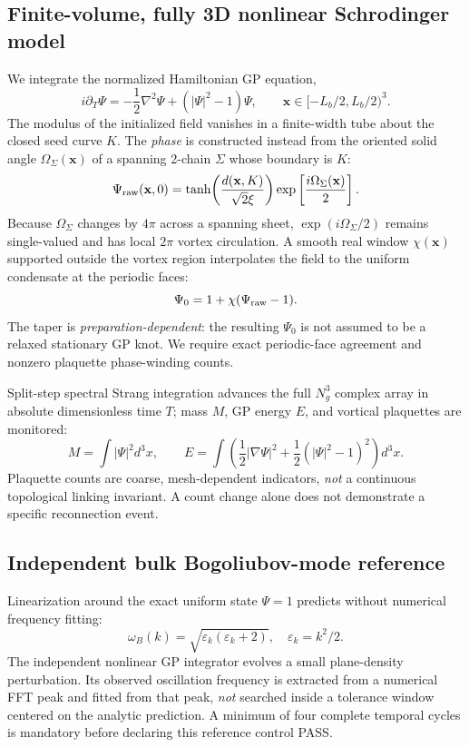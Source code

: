 \documentclass[10pt,a4paper]{article}
\begin{document}
\subsection{Finite-volume, fully 3D nonlinear Schrodinger model}
We integrate the normalized Hamiltonian GP equation,
\begin{equation}
 i\partial_T\Psi=-\frac12\nabla^2\Psi+(|\Psi|^2-1)\Psi,
 \qquad \mathbf{x}\in[-L_b/2,L_b/2)^3.
\end{equation}
The modulus of the initialized field vanishes in a finite-width tube about the closed seed curve $K$. The \emph{phase} is constructed instead from the oriented solid angle $\Omega_{\Sigma}(\mathbf{x})$ of a spanning 2-chain $\Sigma$ whose boundary is $K$:
\begin{equation}
 \Psi_{\rm raw}(\mathbf{x},0)=\tanh\!\left(\frac{d(\mathbf{x},K)}{\sqrt2\xi}\right)
 \exp\left[\frac{i\Omega_{\Sigma}(\mathbf{x})}{2}\right].
\end{equation}
Because $\Omega_{\Sigma}$ changes by $4\pi$ across a spanning sheet, $\exp(i\Omega_{\Sigma}/2)$ remains single-valued and has local $2\pi$ vortex circulation. A smooth real window $\chi(\mathbf{x})$ supported outside the vortex region interpolates the field to the uniform condensate at the periodic faces:
\begin{equation}
 \Psi_0=1+\chi(\Psi_{\rm raw}-1).
\end{equation}
The taper is \emph{preparation-dependent}: the resulting $\Psi_0$ is not assumed to be a relaxed stationary GP knot. We require exact periodic-face agreement and nonzero plaquette phase-winding counts.

Split-step spectral Strang integration advances the full $N_g^3$ complex array in absolute dimensionless time $T$; mass $M$, GP energy $E$, and vortical plaquettes are monitored:
\begin{equation}
 M=\int|\Psi|^2d^3x,\qquad
 E=\int\left(\frac12|\nabla\Psi|^2+\frac12(|\Psi|^2-1)^2\right)d^3x.
\end{equation}
Plaquette counts are coarse, mesh-dependent indicators, \emph{not} a continuous topological linking invariant. A count change alone does not demonstrate a specific reconnection event.

\subsection{Independent bulk Bogoliubov-mode reference}
Linearization around the exact uniform state $\Psi=1$ predicts without numerical frequency fitting:
\begin{equation}
 \boxed{\omega_B(k)=\sqrt{\varepsilon_k(\varepsilon_k+2)},\quad\varepsilon_k=k^2/2.}
\end{equation}
The independent nonlinear GP integrator evolves a small plane-density perturbation. Its observed oscillation frequency is extracted from a numerical FFT peak and fitted from that peak, \emph{not} searched inside a tolerance window centered on the analytic prediction. A minimum of four complete temporal cycles is mandatory before declaring this reference control PASS.
\end{document}

